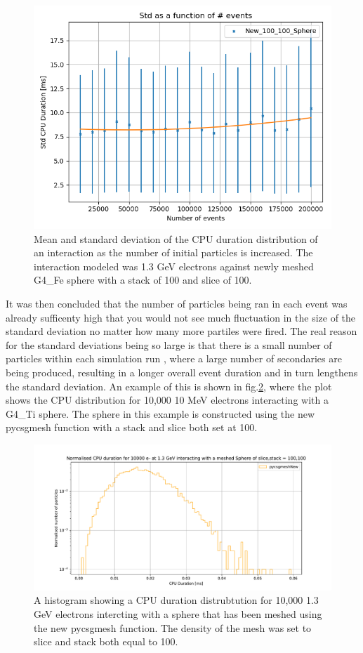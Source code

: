 \documentclass[12pt,a4paper]{article}
\begin{document}
\begin{figure}[h!]
\centering
\includegraphics[scale=0.6]{Images//Error//std_N.png}
\caption[width=\columnwidth]{Mean and standard deviation of the CPU duration distribution of an interaction as the number of initial particles is increased. The interaction modeled was 1.3 GeV electrons against  newly meshed G4\_Fe sphere with a stack of 100 and slice of 100.}
\label{err}
\end{figure}

\noindent It was then concluded that the number of particles being ran in each event was already sufficenty high that you would not see much fluctuation in the size of the standard deviation no matter how many more partiles were fired. The real reason for the standard deviations being so large is that there is a small number of particles within each simulation run , where a large number of secondaries are being produced, resulting in a longer overall event duration and in turn lengthens the standard deviation. An example of this is shown in fig.\ref{disty}, where the plot shows the CPU distribution for 10,000 10 MeV electrons interacting with a G4\_Ti sphere. The sphere in this example is constructed using the new pycsgmesh function with a stack and slice both set at 100.

\begin{figure}[h!]
\centering
\includegraphics[scale=0.5]{Images//CPU//pythonhist1.pdf}
\caption[width=\columnwidth]{A  histogram showing a CPU duration distrubtution for 10,000 1.3 GeV electrons intercting with a sphere that has been meshed using the new pycsgmesh function. The density of the mesh was set to slice and stack both equal to 100.}
\label{disty}
\end{figure}
\end{document}
